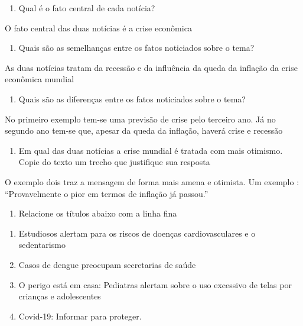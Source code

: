 {\begin{enumerate}
\def\labelenumi{\arabic{enumi})}
\tightlist
\item
  Qual é o fato central de cada notícia?
\end{enumerate}

O fato central das duas notícias é a crise econômica

\begin{enumerate}
\def\labelenumi{\arabic{enumi})}
\setcounter{enumi}{1}
\tightlist
\item
  Quais são as semelhanças entre os fatos noticiados sobre o tema?
\end{enumerate}

As duas notícias tratam da recessão e da influência da queda da inflação
da crise econômica mundial

\begin{enumerate}
\def\labelenumi{\arabic{enumi})}
\setcounter{enumi}{2}
\tightlist
\item
  Quais são as diferenças entre os fatos noticiados sobre o tema?
\end{enumerate}

No primeiro exemplo tem-se uma previsão de crise pelo terceiro ano. Já
no segundo ano tem-se que, apesar da queda da inflação, haverá crise e
recessão

\begin{enumerate}
\def\labelenumi{\arabic{enumi})}
\setcounter{enumi}{3}
\tightlist
\item
  Em qual das duas notícias a crise mundial é tratada com mais otimismo.
  Copie do texto um trecho que justifique sua resposta
\end{enumerate}

O exemplo dois traz a mensagem de forma mais amena e otimista. Um
exemplo : ``Provavelmente o pior em termos de inflação já passou.''

\begin{enumerate}
\def\labelenumi{\arabic{enumi})}
\setcounter{enumi}{4}
\tightlist
\item
  Relacione os títulos abaixo com a linha fina
\end{enumerate}

\begin{enumerate}
\def\labelenumi{(\arabic{enumi})}
\item
  Estudiosos alertam para os riscos de doenças cardiovasculares e o
  sedentarismo
\item
  Casos de dengue preocupam secretarias de saúde
\item
  O perigo está em casa: Pediatras alertam sobre o uso excessivo de
  telas por crianças e adolescentes
\item
  Covid-19: Informar para proteger.
\end{enumerate}

}
